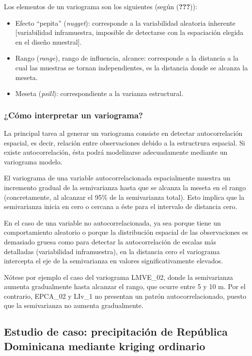 \documentclass[11pt,]{article}
\begin{document}
Los elementos de un variograma son los siguientes (según
({\textbf{???}})):

\begin{itemize}
\item
  Efecto ``pepita'' (\emph{nugget}): corresponde a la variabilidad
  aleatoria inherente {[}variabilidad inframuestra, imposible de
  detectarse con la espaciación elegida en el diseño muestral{]}.
\item
  Rango (\emph{range}), rango de influencia, alcance: corresponde a la
  distancia a la cual las muestras se tornan independientes, es la
  distancia donde se alcanza la meseta.
\item
  Meseta (\emph{psill}): correspondiente a la varianza estructural.
\end{itemize}

\subsubsection{¿Cómo interpretar un
variograma?}\label{cuxf3mo-interpretar-un-variograma}

La principal tarea al generar un variograma consiste en detectar
autocorrelación espacial, es decir, relación entre observaciones debido
a la estructrura espacial. Si existe autocorrelación, ésta podrá
modelizarse adecuadamente mediante un variograma modelo.

El variograma de una variable autocorrelacionada espacialmente muestra
un incremento gradual de la semivarianza hasta que se alcanza la meseta
en el rango (concretamente, al alcanzar el 95\% de la semivarianza
total). Esto implica que la semivarianza inicia en cero o cercana a éste
para el intervalo de distancia cero.

En el caso de una variable no autocorrelacionada, ya sea porque tiene un
comportamiento aleatorio o porque la distribución espacial de las
observaciones es demasiado gruesa como para detectar la autocorrelación
de escalas más detalladas (variabilidad inframuestra), en la distancia
cero el variograma intercepta el eje de la semivarianza en valores
significativamente elevados.

Nótese por ejemplo el caso del variograma LMVE\_02, donde la
semivarianza aumenta gradualmente hasta alcanzar el rango, que ocurre
entre 5 y 10 m. Por el contrario, EPCA\_02 y LIv\_1 no presentan un
patrón autocorrelacionado, puesto que la semivarianza no aumenta
gradualmente.

\subsection{Estudio de caso: precipitación de República Dominicana
mediante kriging
ordinario}\label{estudio-de-caso-precipitaciuxf3n-de-repuxfablica-dominicana-mediante-kriging-ordinario}
\end{document}
